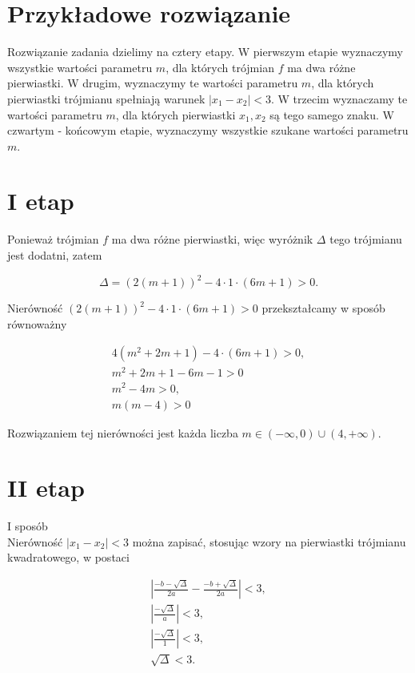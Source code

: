 \documentclass[10pt]{article}
\begin{document}
\section*{Przykładowe rozwiązanie}
Rozwiązanie zadania dzielimy na cztery etapy. W pierwszym etapie wyznaczymy wszystkie wartości parametru $m$, dla których trójmian $f$ ma dwa różne pierwiastki. W drugim, wyznaczymy te wartości parametru $m$, dla których pierwiastki trójmianu spełniają warunek $\left|x_{1}-x_{2}\right|<3$. W trzecim wyznaczamy te wartości parametru $m$, dla których pierwiastki $x_{1}, x_{2}$ są tego samego znaku. W czwartym - końcowym etapie, wyznaczymy wszystkie szukane wartości parametru $m$.

\section*{I etap}
Ponieważ trójmian $f$ ma dwa różne pierwiastki, więc wyróżnik $\Delta$ tego trójmianu jest dodatni, zatem

$$
\Delta=(2(m+1))^{2}-4 \cdot 1 \cdot(6 m+1)>0 .
$$

Nierówność $(2(m+1))^{2}-4 \cdot 1 \cdot(6 m+1)>0$ przekształcamy w sposób równoważny

$$
\begin{gathered}
4\left(m^{2}+2 m+1\right)-4 \cdot(6 m+1)>0, \\
m^{2}+2 m+1-6 m-1>0 \\
m^{2}-4 m>0, \\
m(m-4)>0
\end{gathered}
$$

Rozwiązaniem tej nierówności jest każda liczba $m \in(-\infty, 0) \cup(4,+\infty)$.

\section*{II etap}
I sposób\\
Nierówność $\left|x_{1}-x_{2}\right|<3$ można zapisać, stosując wzory na pierwiastki trójmianu kwadratowego, w postaci

$$
\begin{gathered}
\left|\frac{-b-\sqrt{\Delta}}{2 a}-\frac{-b+\sqrt{\Delta}}{2 a}\right|<3, \\
\left|\frac{-\sqrt{\Delta}}{a}\right|<3, \\
\left|\frac{-\sqrt{\Delta}}{1}\right|<3, \\
\sqrt{\Delta}<3 .
\end{gathered}
$$
\end{document}
